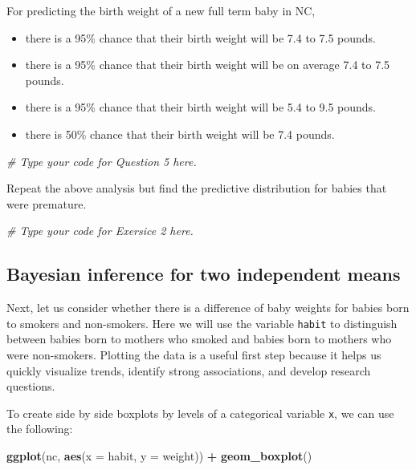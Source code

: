 \documentclass[]{article}
\newenvironment{Shaded}{\begin{snugshade}}{\end{snugshade}}
\newcommand{\KeywordTok}[1]{\textcolor[rgb]{0.13,0.29,0.53}{\textbf{#1}}}
\newcommand{\DataTypeTok}[1]{\textcolor[rgb]{0.13,0.29,0.53}{#1}}
\newcommand{\StringTok}[1]{\textcolor[rgb]{0.31,0.60,0.02}{#1}}
\newcommand{\CommentTok}[1]{\textcolor[rgb]{0.56,0.35,0.01}{\textit{#1}}}
\newcommand{\OperatorTok}[1]{\textcolor[rgb]{0.81,0.36,0.00}{\textbf{#1}}}
\newcommand{\NormalTok}[1]{#1}
\providecommand{\tightlist}{%
  \setlength{\itemsep}{0pt}\setlength{\parskip}{0pt}}
\begin{document}
For predicting the birth weight of a new full term baby in NC,

\begin{itemize}
\tightlist
\item
  there is a 95\% chance that their birth weight will be 7.4 to 7.5
  pounds.
\item
  there is a 95\% chance that their birth weight will be on average 7.4
  to 7.5 pounds.
\item
  there is a 95\% chance that their birth weight will be 5.4 to 9.5
  pounds.
\item
  there is 50\% chance that their birth weight will be 7.4 pounds.
\end{itemize}

\begin{Shaded}
\begin{Highlighting}[]
\CommentTok{# Type your code for Question 5 here.}
\end{Highlighting}
\end{Shaded}

Repeat the above analysis but find the predictive distribution for
babies that were premature.

\begin{Shaded}
\begin{Highlighting}[]
\CommentTok{# Type your code for Exersice 2 here.}
\end{Highlighting}
\end{Shaded}

\subsection{Bayesian inference for two independent
means}\label{bayesian-inference-for-two-independent-means}

Next, let us consider whether there is a difference of baby weights for
babies born to smokers and non-smokers. Here we will use the variable
\texttt{habit} to distinguish between babies born to mothers who smoked
and babies born to mothers who were non-smokers. Plotting the data is a
useful first step because it helps us quickly visualize trends, identify
strong associations, and develop research questions.

To create side by side boxplots by levels of a categorical variable
\texttt{x}, we can use the following:

\begin{Shaded}
\begin{Highlighting}[]
\KeywordTok{ggplot}\NormalTok{(nc, }\KeywordTok{aes}\NormalTok{(}\DataTypeTok{x =}\NormalTok{ habit, }\DataTypeTok{y =}\NormalTok{ weight)) }\OperatorTok{+}
\StringTok{  }\KeywordTok{geom_boxplot}\NormalTok{()}
\end{Highlighting}
\end{Shaded}
\end{document}
